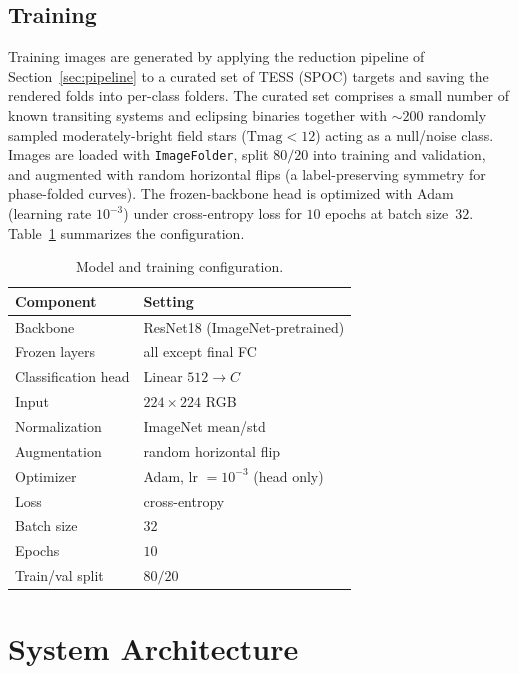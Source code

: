 \documentclass[twocolumn,10pt]{article}
\newcommand{\code}[1]{\texttt{\small #1}}
\begin{document}
\subsection{Training}
Training images are generated by applying the reduction pipeline of
Section~\ref{sec:pipeline} to a curated set of TESS (SPOC) targets and saving the
rendered folds into per-class folders. The curated set comprises a small number of
known transiting systems and eclipsing binaries together with ${\sim}200$ randomly
sampled moderately-bright field stars ($\mathrm{Tmag}<12$) acting as a null/noise
class. Images are loaded with \code{ImageFolder}, split $80/20$ into training and
validation, and augmented with random horizontal flips (a label-preserving
symmetry for phase-folded curves). The frozen-backbone head is optimized with Adam
(learning rate $10^{-3}$) under cross-entropy loss for $10$ epochs at batch
size~$32$. Table~\ref{tab:hyper} summarizes the configuration.

\begin{table}[t]
\centering
\caption{Model and training configuration.}
\label{tab:hyper}
\small
\begin{tabular}{@{}ll@{}}
\toprule
\textbf{Component} & \textbf{Setting} \\
\midrule
Backbone        & ResNet18 (ImageNet-pretrained) \\
Frozen layers   & all except final FC \\
Classification head & Linear $512 \rightarrow C$ \\
Input           & $224\times224$ RGB \\
Normalization   & ImageNet mean/std \\
Augmentation    & random horizontal flip \\
Optimizer       & Adam, lr $=10^{-3}$ (head only) \\
Loss            & cross-entropy \\
Batch size      & $32$ \\
Epochs          & $10$ \\
Train/val split & $80/20$ \\
\bottomrule
\end{tabular}
\end{table}

\section{System Architecture}
\end{document}
